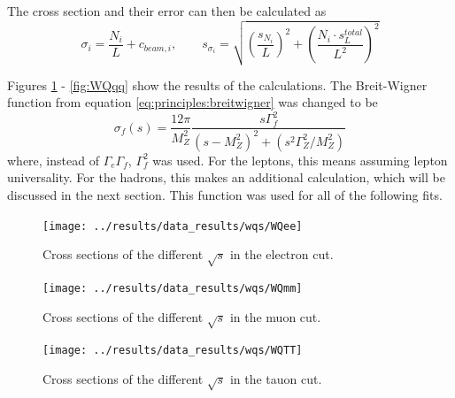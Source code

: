 The cross section and their error can then be calculated as
\begin{equation}
\sigma_i=\frac{N_i}{L}+c_{beam,i}, \qquad s_{\sigma_i}=\sqrt{(\frac{s_{N_i}}{L})^2+(\frac{N_i\cdot s_L^{total}}{L^2})^2}
\end{equation}

Figures \ref{fig:WQee} - \ref{fig:WQqq} show the results of the calculations. The Breit-Wigner function from equation \ref{eq:principles:breitwigner} was changed to be
\begin{equation}
\sigma_f(s) = \frac{12\pi}{M_Z^2} \frac{s\Gamma_f^2}{(s-M_Z^2)^2+(s^2\Gamma_Z^2/M_Z^2)}
\end{equation}
where, instead of $\Gamma_e\Gamma_f$, $\Gamma_f^2$ was used. For the leptons, this means assuming lepton universality. For the hadrons, this makes an additional calculation, which will be discussed in the next section. This function was used for all of the following fits.

\begin{figure}[H]
\centering
\texttt{[image: ../results/data\_results/wqs/WQee]}
\caption[Cross sections for electron cut]{Cross sections of the different $\sqrt{s}$ in the electron cut.}
\label{fig:WQee}
\end{figure}

\begin{figure}[H]
\centering
\texttt{[image: ../results/data\_results/wqs/WQmm]}
\caption[Cross sections for muon cut]{Cross sections of the different $\sqrt{s}$ in the muon cut.}
\label{fig:WQmm}
\end{figure}

\begin{figure}[H]
	\centering
	\texttt{[image: ../results/data\_results/wqs/WQTT]}
	\caption[Cross sections for tauon cut]{Cross sections of the different $\sqrt{s}$ in the tauon cut.}
	\label{fig:WQTT}
\end{figure}

